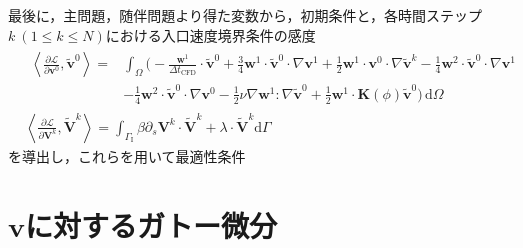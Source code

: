 \documentclass[a4paper,xelatex,ja=standard]{bxjsarticle}
\begin{document}
最後に，主問題，随伴問題より得た変数から，初期条件と，各時間ステップ$k \ (1 \leq k \leq N)$における入口速度境界条件の感度
\begin{align}
    \label{eq:adjoint_v0}
    &\begin{aligned}
        \left\langle\frac{\partial \mathcal{L}}{\partial \mathbf{v}^0}, \tilde{\mathbf{v}}^0\right\rangle
        = &\int_{\Omega} \bigg(- \frac{ \mathbf{w}^{1}}{\Delta t_{\text{CFD}}} \cdot \tilde{\mathbf{v}}^0
        + \frac{3}{4} \mathbf{w}^{1} \cdot \tilde{\mathbf{v}}^0 \cdot \nabla \mathbf{v}^{1}
        + \frac{1}{2} \mathbf{w}^{1} \cdot \mathbf{v}^0 \cdot \nabla \tilde{\mathbf{v}}^{k} 
        - \frac{1}{4} \mathbf{w}^{2} \cdot \tilde{\mathbf{v}}^{0} \cdot \nabla \mathbf{v}^1 \\
        &- \frac{1}{4} \mathbf{w}^{2} \cdot \tilde{\mathbf{v}}^{0} \cdot \nabla \mathbf{v}^{0}
         - \frac{1}{2} \nu \nabla \mathbf{w}^{1} : \nabla \tilde{\mathbf{v}}^0
        + \frac{1}{2} \mathbf{w}^{1} \cdot \mathbf{K}(\phi) \tilde{\mathbf{v}}^0 
        \bigg) \, \mathrm{d}\Omega 
    \end{aligned} \\
    &\left\langle\frac{\partial \mathcal{L}}{\partial \mathbf{V}^k}, \widetilde{\mathbf{V}}^k\right\rangle
    =\int_{\Gamma_{\mathrm{I}}} \beta \partial_s \mathbf{V}^k \cdot \widetilde{\mathbf{V}}^k+\lambda \cdot \widetilde{\mathbf{V}}^k \mathrm{d} \Gamma
\end{align}
を導出し，これらを用いて最適性条件


\newpage
\appendix
\renewcommand{\appendixname}{Appendix }
\section{$\mathbf{v}$に対するガトー微分}
\end{document}

